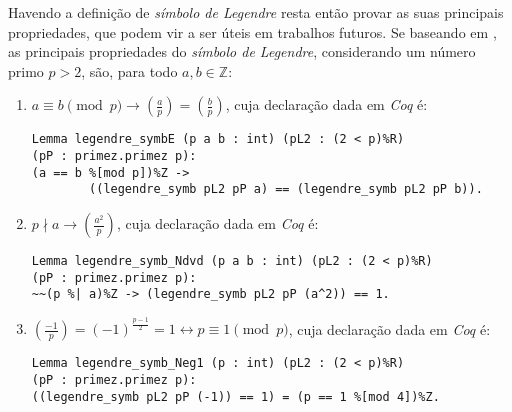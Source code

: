 Havendo a definição de \textit{símbolo de Legendre} resta então provar as suas principais propriedades, que podem vir a ser úteis em trabalhos futuros. Se baseando em \cite{book:2399854}, as principais propriedades do \textit{símbolo de Legendre}, considerando um número primo $p > 2$, são, para todo $a, b \in \mathbb{Z}$:
        \begin{enumerate}
        \item $a \equiv b \pmod{p} \rightarrow \left(\frac{a}{p}\right) = \left(\frac{b}{p}\right)$, cuja declaração dada em \textit{Coq} é:
        \newline
                \begin{lstlisting}[language=coq,frame=single,tabsize=1]
Lemma legendre_symbE (p a b : int) (pL2 : (2 < p)%R) 
(pP : primez.primez p):
(a == b %[mod p])%Z -> 
        ((legendre_symb pL2 pP a) == (legendre_symb pL2 pP b)).
                \end{lstlisting}
        
        \item $p \nmid a \rightarrow \left(\frac{a^2}{p}\right)$, cuja declaração dada em \textit{Coq} é:
        \newline
                \begin{lstlisting}[language=coq,frame=single,tabsize=1]
Lemma legendre_symb_Ndvd (p a b : int) (pL2 : (2 < p)%R) 
(pP : primez.primez p):
~~(p %| a)%Z -> (legendre_symb pL2 pP (a^2)) == 1.
                \end{lstlisting}
        
        \item $\left(\frac{-1}{p}\right) = (-1)^{\frac{p - 1}{2}} = 1 \leftrightarrow p \equiv 1 \pmod{p}$, cuja declaração dada em \textit{Coq} é:
        \newline
                \begin{lstlisting}[language=coq,frame=single,tabsize=1]
Lemma legendre_symb_Neg1 (p : int) (pL2 : (2 < p)%R) 
(pP : primez.primez p):
((legendre_symb pL2 pP (-1)) == 1) = (p == 1 %[mod 4])%Z.
                \end{lstlisting}
        

\end{enumerate}
